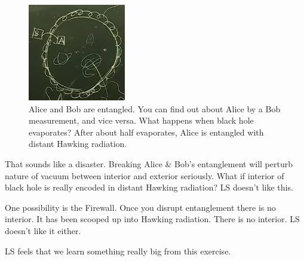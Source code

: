 \documentclass[]{article}
\begin{document}
{\begin{appendices}
	\begin{figure}[H]
		\begin{center}
			\caption[Alice and Bob are entangled.]{Alice and Bob are entangled. You can find out about Alice by a Bob measurement, and vice versa. What happens when black hole evaporates? After about half evaporates, Alice is entangled with distant Hawking radiation.}\label{fig:ibh-horizon-alice-bob}
			\includegraphics{ibh-horizon-alice-bob}
		\end{center}
	\end{figure}
	That sounds like a disaster. Breaking Alice \& Bob's entanglement will perturb nature of vacuum between interior and exterior seriously. What if interior of black hole is really encoded in distant Hawking radiation? LS doesn't like this.
	
	One possibility is the Firewall. Once you disrupt entanglement there is no interior. It has been scooped up into Hawking radiation. There is no interior. LS doesn't like it either.
	
	LS feels that we learn something really big from this exercise.
	


\end{appendices}}
\end{document}
